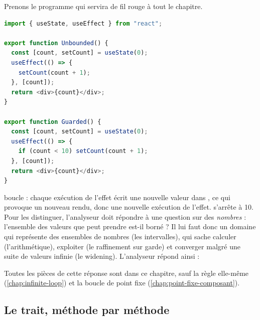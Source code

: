 Prenons le programme qui servira de fil rouge à tout le chapitre.

\begin{lstlisting}[language=TypeScript,caption={Deux compteurs (\file{/tmp/ch09/counter.tsx}, repris de \file{tests/fixtures/widening.tsx})},label={lst:treillis-simples-counter}]
import { useState, useEffect } from "react";

export function Unbounded() {
  const [count, setCount] = useState(0);
  useEffect(() => {
    setCount(count + 1);
  }, [count]);
  return <div>{count}</div>;
}

export function Guarded() {
  const [count, setCount] = useState(0);
  useEffect(() => {
    if (count < 10) setCount(count + 1);
  }, [count]);
  return <div>{count}</div>;
}
\end{lstlisting}

 boucle : chaque exécution de l'effet écrit une nouvelle valeur
dans , ce qui provoque un nouveau rendu, donc une nouvelle
exécution de l'effet.  s'arrête à 10. Pour les distinguer,
l'analyseur doit répondre à une question sur des \emph{nombres} : l'ensemble
des valeurs que  peut prendre est-il borné ? Il lui faut donc un
domaine qui représente des ensembles de nombres (les intervalles), qui sache
calculer  (l'arithmétique), exploiter  (le
raffinement sur garde) et converger malgré une suite de valeurs infinie (le
widening). L'analyseur répond ainsi :


Toutes les pièces de cette réponse sont dans ce chapitre, sauf la règle
elle-même (\cref{chap:infinite-loop}) et la boucle de point fixe
(\cref{chap:point-fixe-composant}).

\subsection{Le trait, méthode par méthode}

